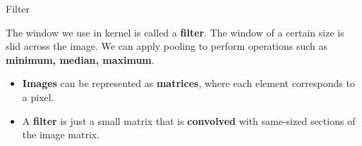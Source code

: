 \documentclass[aspectratio=169,xcolor=dvipsnames,svgnames,x11names,fleqn]{beamer}
\begin{document}
\begin{frame}[fragile]{Filter}
    
    \begin{tcolorbox}[colback=bgLight, colframe=accentCyan, arc=2mm, boxrule=0.5pt, left=2mm]
        \small
        The window we use in kernel is called a \textcolor{accentCyan}{\textbf{filter}}. The window of a certain size is slid across the image. We can apply pooling to perform operations such as \textbf{minimum, median, maximum}.
    \end{tcolorbox}

    \vspace{0.4cm}

    \begin{itemize}
        \item \textbf{Images} can be represented as \textcolor{mainNavy}{\textbf{matrices}}, where each element corresponds to a pixel.
        
        \vspace{0.3cm}
        
        \item A \textbf{filter} is just a small matrix that is \textcolor{accentCyan}{\textbf{convolved}} with same-sized sections of the image matrix.
    \end{itemize}

    \vfill

    \centering

\end{frame}
\end{document}
